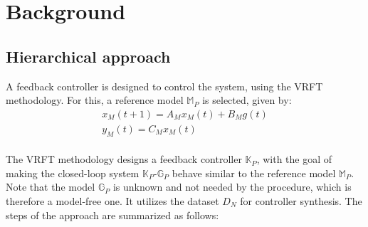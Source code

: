\documentclass[letterpaper, 10 pt, conference]{ieeeconf}  %
\begin{document}
\section{Background}
\label{Background}
\subsection{Hierarchical approach}
A feedback controller is designed to control the system, using the VRFT methodology. For this, a reference model $\mathbb{M}_P$ is selected, given by:
	\begin{equation*}
	\begin{matrix}
	x_M(t+1) = A_Mx_M(t) + B_Mg(t)\\
	y_M(t) = C_Mx_M(t)
	\end{matrix}
	\end{equation*}\\  
 The VRFT methodology designs a feedback controller  $\mathbb{K}_P$, with the goal of making the closed-loop system $\mathbb{K}_P$-$\mathbb{G}_P$ behave similar to the reference model $\mathbb{M}_P$. Note that the model $\mathbb{G}_P$ is unknown and not needed by the procedure, which is therefore a model-free one. It utilizes the dataset $D_N$ for controller synthesis. The steps of the approach are summarized as follows:
\end{document}
